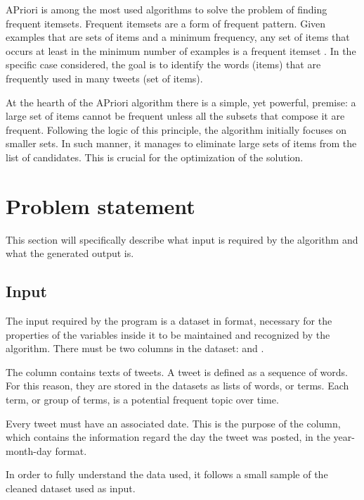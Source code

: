 APriori is among the most used algorithms to solve the problem of finding frequent itemsets. Frequent itemsets are a form of frequent pattern. Given examples that are sets of items and a minimum frequency, any set of items that occurs at least in the minimum number of examples is a frequent itemset \cite{Toivonen2010}. In the specific case considered, the goal is to identify the words (items) that are frequently used in many tweets (set of items).

At the hearth of the APriori algorithm there is a simple, yet powerful, premise: a large set of items cannot be frequent unless all the subsets that compose it are frequent. Following the logic of this principle, the algorithm initially focuses on smaller sets. In such manner, it manages to eliminate large sets of items from the list of candidates. This is crucial for the optimization of the solution.


\section{Problem statement}\label{sect_probl_stat}

This section will specifically describe what input is required by the algorithm and what the generated output is.

\subsection*{Input}

The input required by the program is a dataset in  format, necessary for the properties of the variables inside it to be maintained and recognized by the algorithm. There must be two columns in the dataset:  and .

The  column contains texts of tweets. A tweet is defined as a sequence of words. For this reason, they are stored in the datasets as lists of words, or terms. Each term, or group of terms, is a potential frequent topic over time.

Every tweet must have an associated date. This is the purpose of the  column, which contains the information regard the day the tweet was posted, in the year-month-day format.

In order to fully understand the data used, it follows a small sample of the cleaned dataset used as input.

